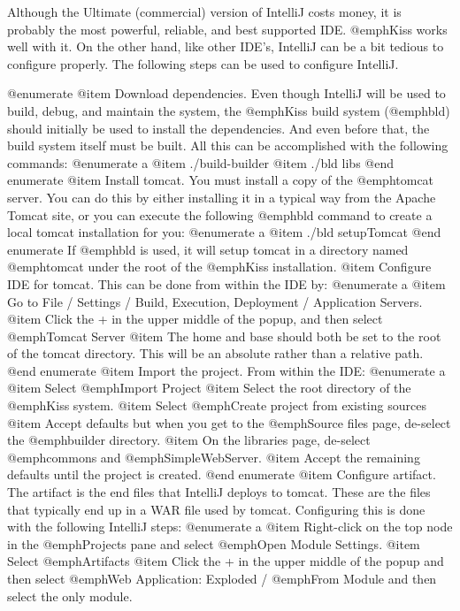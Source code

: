Although the Ultimate (commercial) version of IntelliJ costs money, it
is probably the most powerful, reliable, and best supported IDE.
@emph{Kiss} works well with it.  On the other hand, like other IDE's,
IntelliJ can be a bit tedious to configure properly.  The following
steps can be used to configure IntelliJ.

@enumerate
@item
Download dependencies.  Even though IntelliJ will be used to build,
debug, and maintain the system, the @emph{Kiss} build system
(@emph{bld}) should initially be used to install the dependencies.
And even before that, the build system itself must be built.  All this
can be accomplished with the following commands:
@enumerate a
@item
./build-builder
@item
./bld libs
@end enumerate
@item
Install tomcat.  You must install a copy of the @emph{tomcat} server.
You can do this by either installing it in a typical way from the
Apache Tomcat site, or you can execute the following @emph{bld}
command to create a local tomcat installation for you:
@enumerate a
@item
./bld setupTomcat
@end enumerate
If @emph{bld} is used, it will setup tomcat in a directory named
@emph{tomcat} under the root of the @emph{Kiss} installation.
@item
Configure IDE for tomcat.  This can be done from within the IDE by:
@enumerate a
@item
Go to File / Settings / Build, Execution, Deployment / Application Servers.
@item
Click the + in the upper middle of the popup, and then select @emph{Tomcat Server}
@item
The home and base should both be set to the root of the tomcat directory.  This
will be an absolute rather than a relative path.
@end enumerate
@item
Import the project.  From within the IDE:
@enumerate a
@item
Select @emph{Import Project}
@item
Select the root directory of the @emph{Kiss} system.
@item
Select @emph{Create project from existing sources}
@item
Accept defaults but when you get to the @emph{Source files} page, de-select the 
@emph{builder} directory.
@item
On the libraries page, de-select @emph{commons} and @emph{SimpleWebServer}.
@item
Accept the remaining defaults until the project is created.
@end enumerate
@item
Configure artifact.  The artifact is the end files that IntelliJ deploys to tomcat.  
These are the files that typically end up in a WAR file used by tomcat.  Configuring
this is done with the following IntelliJ steps:
@enumerate a
@item
Right-click on the top node in the @emph{Projects} pane and select
@emph{Open Module Settings}.
@item
Select @emph{Artifacts}
@item
Click the + in the upper middle of the popup and then select @emph{Web
Application: Exploded} / @emph{From Module} and then select the only module.
